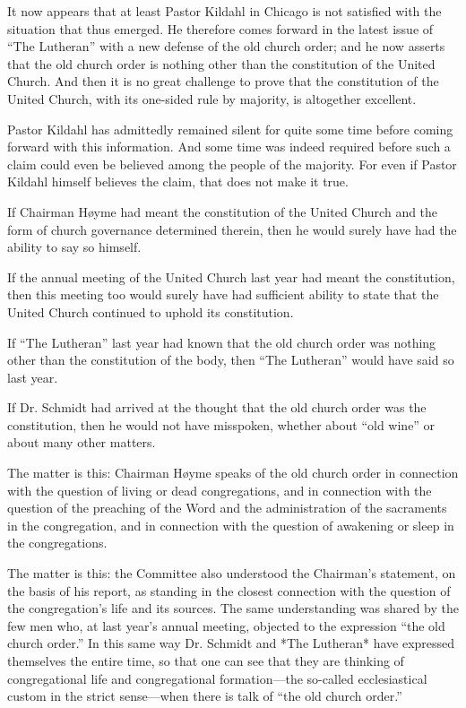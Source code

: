 It now appears that at least Pastor Kildahl in Chicago is not satisfied with the situation that thus emerged. He therefore comes forward in the latest issue of “The Lutheran” with a new defense of the old church order; and he now asserts that the old church order is nothing other than the constitution of the United Church. And then it is no great challenge to prove that the constitution of the United Church, with its one-sided rule by majority, is altogether excellent.

Pastor Kildahl has admittedly remained silent for quite some time before coming forward with this information. And some time was indeed required before such a claim could even be believed among the people of the majority. For even if Pastor Kildahl himself believes the claim, that does not make it true.

If Chairman Høyme had meant the constitution of the United Church and the form of church governance determined therein, then he would surely have had the ability to say so himself.

If the annual meeting of the United Church last year had meant the constitution, then this meeting too would surely have had sufficient ability to state that the United Church continued to uphold its constitution.

If “The Lutheran” last year had known that the old church order was nothing other than the constitution of the body, then “The Lutheran” would have said so last year.

If Dr. Schmidt had arrived at the thought that the old church order was the constitution, then he would not have misspoken, whether about “old wine” or about many other matters.

The matter is this: Chairman Høyme speaks of the old church order in connection with the question of living or dead congregations, and in connection with the question of the preaching of the Word and the administration of the sacraments in the congregation, and in connection with the question of awakening or sleep in the congregations.

The matter is this: the Committee also understood the Chairman’s statement, on the basis of his report, as standing in the closest connection with the question of the congregation’s life and its sources. The same understanding was shared by the few men who, at last year’s annual meeting, objected to the expression “the old church order.” In this same way Dr. Schmidt and *The Lutheran* have expressed themselves the entire time, so that one can see that they are thinking of congregational life and congregational formation—the so-called ecclesiastical custom in the strict sense—when there is talk of “the old church order.”

